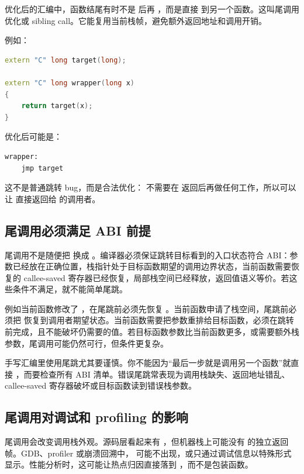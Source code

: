 优化后的汇编中，函数结尾有时不是  后再 ，而是直接  到另一个函数。这叫尾调用优化或 sibling call。它能复用当前栈帧，避免额外返回地址和调用开销。

例如：

\begin{lstlisting}[language=C++]
extern "C" long target(long);

extern "C" long wrapper(long x)
{
    return target(x);
}
\end{lstlisting}

优化后可能是：

\begin{lstlisting}
wrapper:
    jmp target
\end{lstlisting}

这不是普通跳转 bug，而是合法优化： 不需要在  返回后再做任何工作，所以可以让  直接返回给  的调用者。

\subsection{尾调用必须满足 ABI 前提}

尾调用不是随便把  换成 。编译器必须保证跳转目标看到的入口状态符合 ABI：参数已经放在正确位置，栈指针处于目标函数期望的调用边界状态，当前函数需要恢复的 callee-saved 寄存器已经恢复，局部栈空间已经释放，返回值语义等价。若这些条件不满足，就不能简单尾跳。

例如当前函数修改了 ，在尾跳前必须先恢复 。当前函数申请了栈空间，尾跳前必须把  恢复到调用者期望状态。当前函数需要把参数重排给目标函数，必须在跳转前完成，且不能破坏仍需要的值。若目标函数参数比当前函数更多，或需要额外栈参数，尾调用可能仍然可行，但条件更复杂。

手写汇编里使用尾跳尤其要谨慎。你不能因为“最后一步就是调用另一个函数”就直接 ，而要检查所有 ABI 清单。错误尾跳常表现为调用栈缺失、返回地址错乱、callee-saved 寄存器破坏或目标函数读到错误栈参数。

\subsection{尾调用对调试和 profiling 的影响}

尾调用会改变调用栈外观。源码层看起来有 ，但机器栈上可能没有  的独立返回帧。GDB、profiler 或崩溃回溯中， 可能不出现，或只通过调试信息以特殊形式显示。性能分析时，这可能让热点归因直接落到 ，而不是包装函数。

